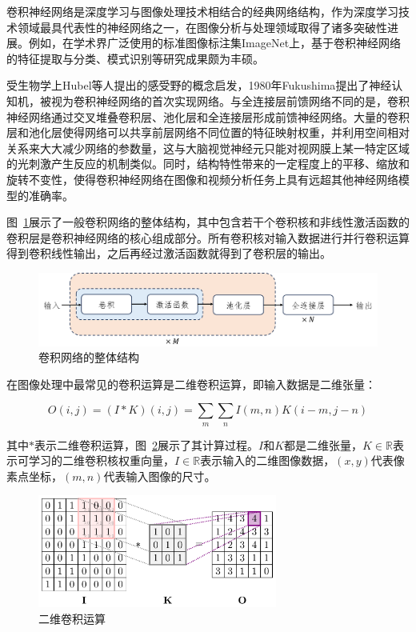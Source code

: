 卷积神经网络是深度学习与图像处理技术相结合的经典网络结构，作为深度学习技术领域最具代表性的神经网络之一，在图像分析与处理领域取得了诸多突破性进展。例如，在学术界广泛使用的标准图像标注集ImageNet上，基于卷积神经网络的特征提取与分类、模式识别等研究成果颇为丰硕。

受生物学上Hubel等人\cite{hubel1962}提出的感受野的概念启发，1980年Fukushima\cite{fukushima1980}提出了神经认知机，被视为卷积神经网络的首次实现网络。与全连接层前馈网络不同的是，卷积神经网络通过交叉堆叠卷积层、池化层和全连接层形成前馈神经网络。大量的卷积层和池化层使得网络可以共享前层网络不同位置的特征映射权重，并利用空间相对关系来大大减少网络的参数量，这与大脑视觉神经元只能对视网膜上某一特定区域的光刺激产生反应的机制类似。同时，结构特性带来的一定程度上的平移、缩放和旋转不变性，使得卷积神经网络在图像和视频分析任务上具有远超其他神经网络模型的准确率。

图~\ref{fig:cnn}展示了一般卷积网络的整体结构，其中包含若干个卷积核和非线性激活函数的卷积层是卷积神经网络的核心组成部分。所有卷积核对输入数据进行并行卷积运算得到卷积线性输出，之后再经过激活函数就得到了卷积层的输出\cite{Goodfellow-et-al-2016}。

\begin{figure}[htbp]
    \centering
    \includegraphics[width=\textwidth]{fig/cnn_frame.png}
    \caption{卷积网络的整体结构}
    \label{fig:cnn}
\end{figure}

在图像处理中最常见的卷积运算是二维卷积运算，即输入数据是二维张量：

\begin{equation}
    O(i, j)=(I * K)(i, j)=\sum_{m} \sum_{n} I(m, n) K(i-m, j-n)
\end{equation}

其中$*$表示二维卷积运算，图~\ref{fig:2dcnn}展示了其计算过程。$I$和$K$都是二维张量，$ K \in \mathbb{R}$表示可学习的二维卷积核权重向量，$I \in \mathbb{R}$表示输入的二维图像数据，$(x, y)$代表像素点坐标，$(m, n)$代表输入图像的尺寸。

\begin{figure}[htbp]
    \centering
    \includegraphics[width=0.7\textwidth]{fig/2dcnn-1.png}
    \caption{二维卷积运算}
    \label{fig:2dcnn}
\end{figure}

